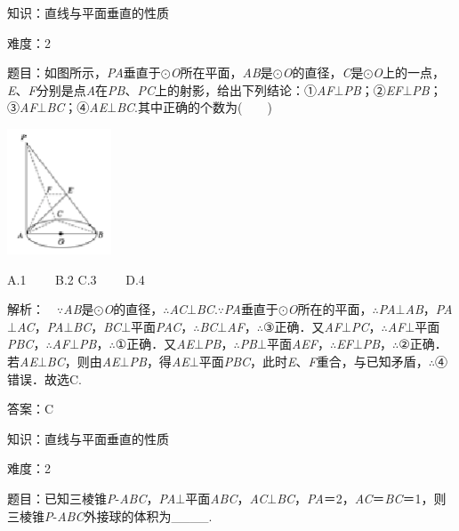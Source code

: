 \documentclass{article} %
\begin{document}
知识：直线与平面垂直的性质

难度：2

题目：如图所示，\textit{PA}垂直于$\mathrm{\odot}$\textit{O}所在平面，\textit{AB}是$\mathrm{\odot}$\textit{O}的直径，\textit{C}是$\mathrm{\odot}$\textit{O}上的一点，\textit{E}、\textit{F}分别是点\textit{A}在\textit{PB}、\textit{PC}上的射影，给出下列结论：①\textit{AF}$\mathrm{\bot}$\textit{PB}；②\textit{EF}$\mathrm{\bot}$\textit{PB}；③\textit{AF}$\mathrm{\bot}$\textit{BC}；④\textit{AE}$\mathrm{\bot}$\textit{BC}.其中正确的个数为(　　)

\includegraphics*[width=1.22in, height=1.47in, keepaspectratio=false]{image241}

A.1　　 B.2 C.3　　 D.4

解析：　$\mathrm{\because}$\textit{AB}是$\mathrm{\odot}$\textit{O}的直径，$\mathrm{\therefore}$\textit{AC}$\mathrm{\bot}$\textit{BC}.$\mathrm{\because}$\textit{PA}垂直于$\mathrm{\odot}$\textit{O}所在的平面，$\mathrm{\therefore}$\textit{PA}$\mathrm{\bot}$\textit{AB}，\textit{PA}$\mathrm{\bot}$\textit{AC}，\textit{PA}$\mathrm{\bot}$\textit{BC}，\textit{BC}$\mathrm{\bot}$平面\textit{PAC}，$\mathrm{\therefore}$\textit{BC}$\mathrm{\bot}$\textit{AF}，$\mathrm{\therefore}$③正确．又\textit{AF}$\mathrm{\bot}$\textit{PC}，$\mathrm{\therefore}$\textit{AF}$\mathrm{\bot}$平面\textit{PBC}，$\mathrm{\therefore}$\textit{AF}$\mathrm{\bot}$\textit{PB}，$\mathrm{\therefore}$①正确．又\textit{AE}$\mathrm{\bot}$\textit{PB}，$\mathrm{\therefore}$\textit{PB}$\mathrm{\bot}$平面\textit{AEF}，$\mathrm{\therefore}$\textit{EF}$\mathrm{\bot}$\textit{PB}，$\mathrm{\therefore}$②正确．若\textit{AE}$\mathrm{\bot}$\textit{BC}，则由\textit{AE}$\mathrm{\bot}$\textit{PB}，得\textit{AE}$\mathrm{\bot}$平面\textit{PBC}，此时\textit{E}、\textit{F}重合，与已知矛盾，$\mathrm{\therefore}$④错误．故选C.

答案：C



知识：直线与平面垂直的性质

难度：2

题目：已知三棱锥\textit{P}-\textit{ABC}，\textit{PA}$\mathrm{\bot}$平面\textit{ABC}，\textit{AC}$\mathrm{\bot}$\textit{BC}，\textit{PA}＝2，\textit{AC}＝\textit{BC}＝1，则三棱锥\textit{P}-\textit{ABC}外接球的体积为\_\_\_\_.
\end{document}
